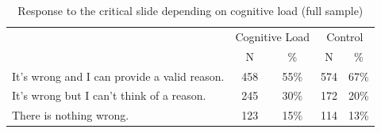 \documentclass[
  man,floatsintext]{apa6}
\begin{document}
\begin{table}[tbp]

\begin{center}
\begin{threeparttable}

\caption{\label{tab:tabS6tab1dumb1all}Response to the critical slide depending on cognitive load (full sample)}

\begin{tabular}{lcccc}
\toprule
 & \multicolumn{2}{c}{Cognitive Load} & \multicolumn{2}{c}{Control} \\
\cmidrule(r){2-3} \cmidrule(r){4-5}
 & \multicolumn{1}{c}{N} & \multicolumn{1}{c}{\%} & \multicolumn{1}{c}{N} & \multicolumn{1}{c}{\%}\\
\midrule
It's wrong and I can provide a valid reason. & 458 & 55\% & 574 & 67\%\\
It's wrong but I can't think of a reason. & 245 & 30\% & 172 & 20\%\\
There is nothing wrong. & 123 & 15\% & 114 & 13\%\\
\bottomrule
\end{tabular}

\end{threeparttable}
\end{center}

\end{table}
\end{document}
